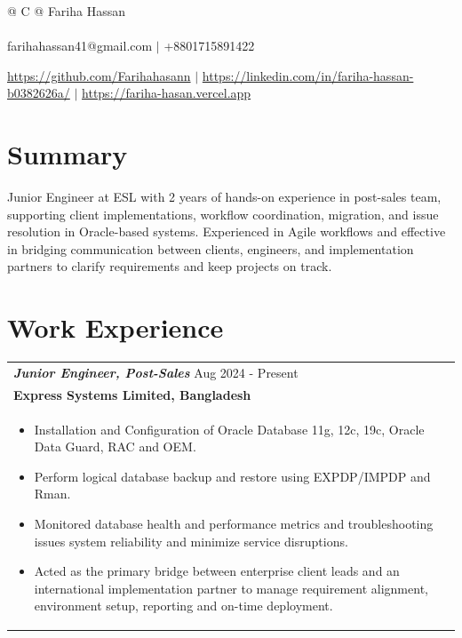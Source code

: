\documentclass[a4paper,8pt]{article}
\begin{document}
\pagestyle{empty}

\begin{tabularx}{\linewidth}{@{} C @{}}
\color[HTML]{1C033C} \Huge{Fariha Hassan} \\[6pt]
\\
\textcolor[HTML]{371e77}{{{{\faEnvelope} farihahassan41@gmail.com}} $|$}
\textcolor[HTML]{371e77}{{{\faMobile} +8801715891422}}

\textcolor[HTML]{371e77}{\underline{{\raisebox{-0.05\height}{\faGithub} https://github.com/Farihahasann}} $|$}
\textcolor[HTML]{371e77}{\underline{{\raisebox{-0.05\height}{\faLinkedin} https://linkedin.com/in/fariha-hassan-b0382626a/}} $|$}
\textcolor[HTML]{371e77}{\underline{{\raisebox{-0.05\height}{\faGlobe} https://fariha-hasan.vercel.app}}}


\end{tabularx}

\section{Summary}
\color[HTML]{1C033C} Junior Engineer at ESL with 2 years of hands-on experience in post-sales team, supporting client implementations, 
workflow coordination, migration, and issue resolution in Oracle-based systems. Experienced in Agile workflows and 
effective in bridging communication between clients, engineers, and implementation partners to clarify requirements and 
keep projects on track. 


\section{Work Experience}

\begin{tabularx}{\linewidth}{ @{}l r@{} }
\color[HTML]{371e77}\textbf{\textit{Junior Engineer, Post-Sales}} \hfill \color[HTML]{371e77} Aug 2024 - Present \\[4pt]
\textbf{{Express Systems Limited, Bangladesh}} \hfill \\[5pt]
\begin{minipage}[t]{\linewidth}
\begin{itemize}[nosep,after=\strut, leftmargin=2em, itemsep=2pt]
\item Installation and Configuration of Oracle Database 11g, 12c, 19c, Oracle Data Guard, RAC and OEM. 
\item Perform logical database backup and restore using EXPDP/IMPDP and Rman. 
\item Monitored database health and performance metrics and troubleshooting issues 
system reliability and minimize service disruptions.
\item Acted as the primary bridge between enterprise client leads and an international implementation partner to manage requirement alignment, environment setup, reporting and on-time deployment.
\end{itemize}
\end{minipage}
\end{tabularx}
\end{document}
